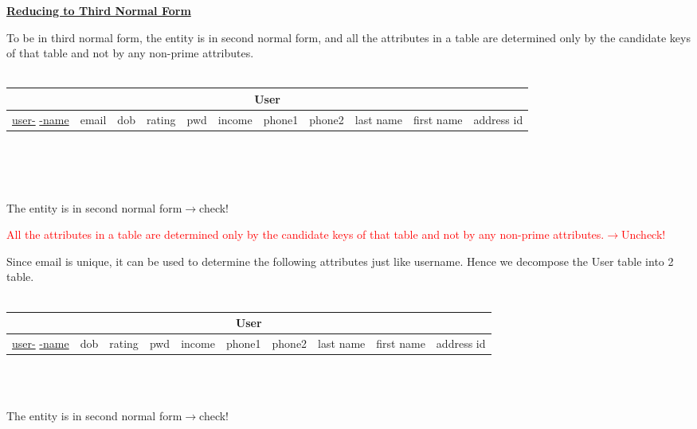 \documentclass[12pt]{article}
\begin{document}
\par \textbf{\underline{Reducing to Third Normal Form}}
\par To be in third normal form, the entity is in second normal form, and all the attributes in a table are determined only by the candidate keys of that table and not by any non-prime attributes.\\\\
\begin{tabularx}{\textwidth}{|X|X|X|X|X|X|X|X|X|X|X|}
\hline
\multicolumn{11}{|c|}{User}\\\hline
\scriptsize \underline{user-} \underline{-name} & \scriptsize email & \scriptsize\cellcolor{green!25}dob & \scriptsize rating & \scriptsize pwd & \scriptsize income & \scriptsize\cellcolor{green!25} phone1 & \scriptsize\cellcolor{green!25} phone2 & \scriptsize\cellcolor{green!25} last name & \scriptsize\cellcolor{green!25} first name & \scriptsize\cellcolor{green!25} address id\\\hline
\end{tabularx}
~\\~\\~\\
\par The entity is in second normal form\hfill $\rightarrow$check!
\par \textcolor{red}{All the attributes in a table are determined only by the candidate keys of that table and not by any non-prime attributes.\hfill $\rightarrow$Uncheck!}
\par Since email is unique, it can be used to determine the following attributes just like username. Hence we decompose the User table into 2 table.\\
~\\
\begin{tabularx}{\textwidth}{|X|X|X|X|X|X|X|X|X|X|}
\hline
\multicolumn{10}{|c|}{User}\\\hline
\scriptsize \underline{user-} \underline{-name} & \scriptsize\cellcolor{green!25}dob & \scriptsize rating & \scriptsize pwd & \scriptsize income & \scriptsize\cellcolor{green!25} phone1 & \scriptsize\cellcolor{green!25} phone2 & \scriptsize\cellcolor{green!25} last name & \scriptsize\cellcolor{green!25} first name & \scriptsize\cellcolor{green!25} address id\\\hline
\end{tabularx}
~\\~\\
\par The entity is in second normal form\hfill $\rightarrow$check!
\end{document}
